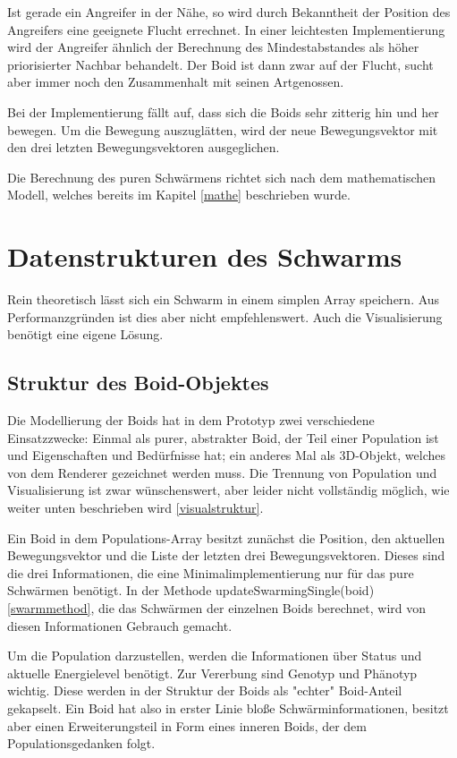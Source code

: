 \documentclass[draft=false
              ,paper=a4
              ,twoside=false
              ,fontsize=11pt
              ,headsepline
              ,BCOR10mm
              ,DIV11
              ,bibtotoc
              ,liststotoc
              ]{scrbook}
\begin{document}
Ist gerade ein Angreifer in der Nähe, so wird durch Bekanntheit der Position des Angreifers eine geeignete Flucht errechnet. In einer leichtesten Implementierung wird der Angreifer ähnlich der Berechnung des Mindestabstandes als höher priorisierter Nachbar behandelt. Der Boid ist dann zwar auf der Flucht, sucht aber immer noch den Zusammenhalt mit seinen Artgenossen.

Bei der Implementierung fällt auf, dass sich die Boids sehr zitterig hin und her bewegen. Um die Bewegung auszuglätten, wird der neue Bewegungsvektor mit den drei letzten Bewegungsvektoren ausgeglichen.

Die Berechnung des puren Schwärmens richtet sich nach dem mathematischen Modell, welches bereits im Kapitel \ref{mathe} beschrieben wurde.

\section{Datenstrukturen des Schwarms}
Rein theoretisch lässt sich ein Schwarm in einem simplen Array speichern. Aus Performanzgründen ist dies aber nicht empfehlenswert. Auch die Visualisierung benötigt eine eigene Lösung.
\subsection{Struktur des Boid-Objektes}
Die Modellierung der Boids hat in dem Prototyp zwei verschiedene Einsatzzwecke: Einmal als purer, abstrakter Boid, der Teil einer Population ist und Eigenschaften und Bedürfnisse hat; ein anderes Mal als 3D-Objekt, welches von dem Renderer gezeichnet werden muss. Die Trennung von Population und Visualisierung ist zwar wünschenswert, aber leider nicht vollständig möglich, wie weiter unten beschrieben wird \ref{visualstruktur}.

Ein Boid in dem Populations-Array besitzt zunächst die Position, den aktuellen Bewegungsvektor und die Liste der letzten drei Bewegungsvektoren. Dieses sind die drei Informationen, die eine Minimalimplementierung nur für das pure Schwärmen benötigt. In der Methode updateSwarmingSingle(boid) \ref{swarmmethod}, die das Schwärmen der einzelnen Boids berechnet, wird von diesen Informationen Gebrauch gemacht.

Um die Population darzustellen, werden die Informationen über Status und aktuelle Energielevel benötigt. Zur Vererbung sind Genotyp und Phänotyp wichtig. Diese werden in der Struktur der Boids als "{}echter"{} Boid-Anteil gekapselt. Ein Boid hat also in erster Linie bloße Schwärminformationen, besitzt aber einen Erweiterungsteil in Form eines inneren Boids, der dem Populationsgedanken folgt.
\end{document}
